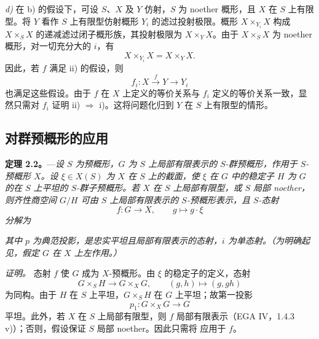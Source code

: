 \medskip
\noindent\textit{d)} 在  b) 的假设下，可设 \(S\)、\(X\) 及 \(Y\) 仿射，\(S\) 为 noether 概形，且 \(X\) 在 \(S\) 上有限型。将 \(Y\) 看作 \(S\) 上有限型仿射概形 \(Y_i\) 的滤过投射极限。概形 \(X\times_{Y_i}X\) 构成 \(X\times_S X\) 的递减滤过闭子概形族，其投射极限为 \(X\times_Y X\)。由于 \(X\times_S X\) 为 noether 概形，对一切充分大的 \(i\)，有
\[
  X\times_{Y_i}X=X\times_Y X.
\]
因此，若 \(f\) 满足  ii) 的假设，则
\[
  f_i:X\xrightarrow{\,f\,}Y\longrightarrow Y_i
\]
也满足这些假设。由于 \(f\) 在 \(X\) 上定义的等价关系与 \(f_i\) 定义的等价关系一致，显然只需对 \(f_i\) 证明 ii) \(\Rightarrow\) i)。这将问题化归到 \(Y\) 在 \(S\) 上有限型的情形。

\subsection*{对群预概形的应用}

\noindent{}%
\textbf{定理 2.2。}---\textit{设 \(S\) 为预概形，\(G\) 为 \(S\) 上局部有限表示的 \(S\)-群预概形，作用于 \(S\)-预概形 \(X\)。设 \(\xi\in X(S)\) 为 \(X\) 在 \(S\) 上的截面，使 \(\xi\) 在 \(G\) 中的稳定子 \(H\) 为 \(G\) 的在 \(S\) 上平坦的 \(S\)-群子预概形。若 \(X\) 在 \(S\) 上局部有限型，或 \(S\) 局部 noether，则齐性商空间 \(G/H\) 可由 \(S\) 上局部有限表示的 \(S\)-预概形表示，且 \(S\)-态射}
\[
  f:G\longrightarrow X,\qquad g\longmapsto g\cdot\xi
\]
\textit{分解为}
\begin{center}
\end{center}
\textit{其中 \(p\) 为典范投影，是忠实平坦且局部有限表示的态射，\(i\) 为单态射。（为明确起见，假定 \(G\) 在 \(X\) 上左作用。）}

\medskip
\noindent\textit{证明。}
态射 \(f\) 使 \(G\) 成为 \(X\)-预概形。由 \(\xi\) 的稳定子的定义，态射
\[
  G\times_S H\longrightarrow G\times_X G,\qquad
  (g,h)\longmapsto(g,gh)
\]
为同构。由于 \(H\) 在 \(S\) 上平坦，\(G\times_S H\) 在 \(G\) 上平坦；故第一投影
\[
  p_1:G\times_X G\longrightarrow G
\]
平坦。此外，若 \(X\) 在 \(S\) 上局部有限型，则 \(f\) 局部有限表示（EGA IV，1.4.3 v)）；否则，假设保证 \(S\) 局部 noether。因此只需将  应用于 \(f\)。

